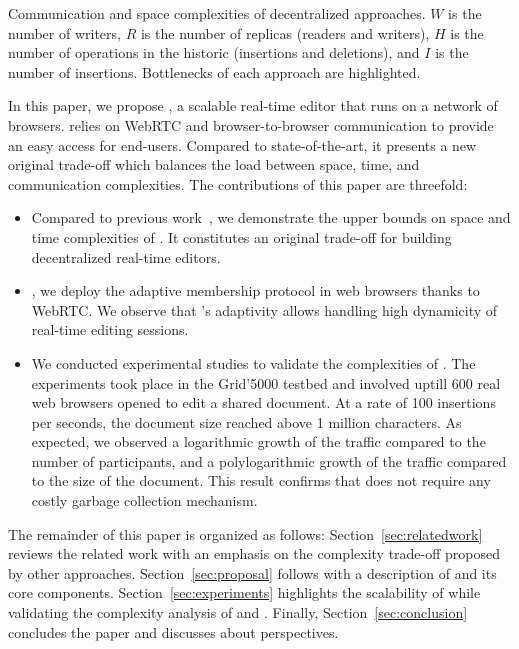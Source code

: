\begin{table*}[t]
  \centering
  
  \caption{\label{table:complexities}
    Communication and space complexities of decentralized approaches.
    $W$ is the number of writers, 
    $R$ is the number of replicas (readers and writers),
    $H$ is the number of operations in the historic (insertions and deletions),
    and $I$ is the number of insertions.
    Bottlenecks of each approach are highlighted.}
\end{table*}

In this paper, we propose \CRATE, a scalable real-time editor that runs on a
network of browsers. \CRATE relies on WebRTC and browser-to-browser
communication to provide an easy access for end-users. Compared to
state-of-the-art, it presents a new original trade-off which balances the load
between space, time, and communication complexities. The contributions of this
paper are threefold:
\begin{itemize}
\item Compared to previous work~\cite{nedelec2013lseq}, we demonstrate the upper
  bounds on space and time complexities of \LSEQ. It constitutes an original
  trade-off for building decentralized real-time editors.
\item {}, we deploy the
  adaptive membership protocol \SPRAY in web browsers thanks to WebRTC. We
  observe that \SPRAY's adaptivity allows handling high dynamicity of real-time
  editing sessions.
\item We conducted experimental studies to validate the complexities of
  \CRATE. The experiments took place in the Grid'5000 testbed and involved
  uptill $600$ real web browsers opened to edit a shared document. At a rate of
  100 insertions per seconds, the document size reached above 1 million
  characters. As expected, we observed a logarithmic growth of the traffic
  compared to the number of participants, and a polylogarithmic growth of the
  traffic compared to the size of the document. This result confirms that \CRATE
  does not require any costly garbage collection mechanism.
\end{itemize}

The remainder of this paper is organized as follows:
Section~\ref{sec:relatedwork} reviews the related work with an emphasis on the
complexity trade-off proposed by other approaches. Section~\ref{sec:proposal}
follows with a description of \CRATE and its core
components. Section~\ref{sec:experiments} highlights the scalability of \CRATE
while validating the complexity analysis of \LSEQ and \SPRAY. Finally,
Section~\ref{sec:conclusion} concludes the paper and discusses about
perspectives.

